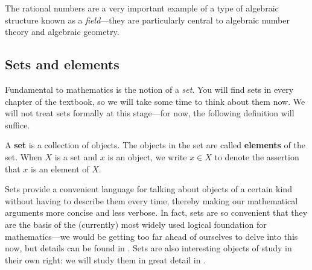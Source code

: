 The rational numbers are a very important example of a type of algebraic structure known as a \textit{field}---they are particularly central to algebraic number theory and algebraic geometry.

%
%
%
%
%

\subsection*{Sets and elements}

Fundamental to mathematics is the notion of a \textit{set}. You will find sets in every chapter of the textbook, so we will take some time to think about them now. We will not treat sets formally at this stage---for now, the following definition will suffice.

\begin{definition}
\label{defSetsPreliminary}
A \textbf{set} is a collection of objects. The objects in the set are called \textbf{elements} of the set. When $X$ is a set and $x$ is an object, we write $x \in X$  to denote the assertion that $x$ is an element of $X$.
\end{definition}

Sets provide a convenient language for talking about objects of a certain kind without having to describe them every time, thereby making our mathematical arguments more concise and less verbose. In fact, sets are so convenient that they are the basis of the (currently) most widely used logical foundation for mathematics---we would be getting too far ahead of ourselves to delve into this now, but details can be found in . Sets are also interesting objects of study in their own right: we will study them in great detail in .

